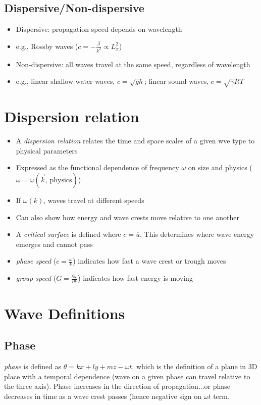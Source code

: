 \documentclass[a4paper,12pt]{article}
\begin{document}
\subsection*{Dispersive/Non-dispersive}
\begin{itemize}
	\item Dispersive: propagation speed depends on wavelength
	\item e.g., Rossby waves ($c = -\frac{\beta}{k^2} \propto L_x^2$)
	\item Non-dispersive: all waves travel at the same speed, regardless of wavelength
	\item e.g., linear shallow water waves, $c = \sqrt{gh}$; linear sound waves, $c = \sqrt{\gamma RT}$
\end{itemize}

\section*{Dispersion relation}
\begin{itemize}
	\item A \emph{dispersion relation} relates the time and space scales of a given wve type to physical parameters
	\item Expressed as the functional dependence of frequency $\omega$ on size and physics ($\omega = \omega(\vec{k}\text{, physics})$)
	\item If $\omega(k)$, waves travel at different speeds
	\item Can also show how energy and wave crests move relative to one another
	\item A \emph{critical surface} is defined where $c = \overline{u}$. This determines where wave energy emerges and cannot pass\
	\item \emph{phase speed} ($c = \frac{\omega}{k}$) indicates how fast a wave crest or trough moves
	\item \emph{group speed} ($G= \frac{\partial \omega}{\partial k}$) indicates how fast energy is moving
\end{itemize}

\section*{Wave Definitions}
\subsection*{Phase}
\emph{phase} is defined as $\theta = kx + ly+ mz - \omega t$, which is the definition of a plane in 3D place with a temporal dependence (wave on a given phase can travel relative to the three axis). Phase increases in the direction of propagation...or phase decreases in time as a wave crest passes (hence negative sign on $\omega t$ term.\\
\end{document}
